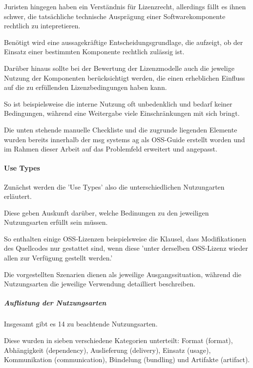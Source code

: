 Juristen hingegen haben ein Verständnis für Lizenzrecht, allerdings fällt es ihnen schwer, die tatsächliche technische Ausprägung einer Softwarekomponente rechtlich zu intepretieren.

Benötigt wird eine aussagekräftige Entscheidungsgrundlage, die aufzeigt, ob der Einsatz einer bestimmten Komponente rechtlich zulässig ist.

Darüber hinaus sollte bei der Bewertung der Lizenzmodelle auch die jewelige Nutzung der Komponenten berücksichtigt werden, die einen erheblichen Einfluss auf die zu erfüllenden Lizenzbedingungen haben kann. 

So ist beispielsweise die interne Nutzung oft unbedenklich und bedarf keiner Bedingungen, während eine Weitergabe viele Einschränkungen mit sich bringt. 

Die unten stehende manuelle Checkliste und die zugrunde liegenden Elemente wurden bereits innerhalb der msg systems ag als OSS-Guide erstellt worden und im Rahmen dieser Arbeit auf das Problemfeld erweitert und angepasst.

\paragraph{Use Types}

Zunächst werden die 'Use Types' also die unterschiedlichen Nutzungarten erläutert. 

Diese geben Auskunft darüber, welche Bedinungen zu den jeweiligen Nutzungsarten erfüllt sein müssen. 

So enthalten einige OSS-Lizenzen beispielsweise die Klausel, dass Modifikationen des Quellcodes nur gestattet sind, wenn diese 'unter derselben OSS-Lizenz wieder allen zur Verfügung gestellt werden.'

Die vorgestellten Szenarien dienen als jeweilige Ausgangssituation, während die Nutzungsarten die jeweilige Verwendung detailliert beschreiben. 

\subparagraph{Auflistung der Nutzungsarten}

Insgesamt gibt es 14 zu beachtende Nutzungsarten.

Diese wurden in sieben verschiedene Kategorien unterteilt: Format (format), Abhängigkeit (dependency), Auslieferung (delivery), Einsatz (usage), Kommunikation (communication), Bündelung (bundling) und Artifakte (artifact). 

